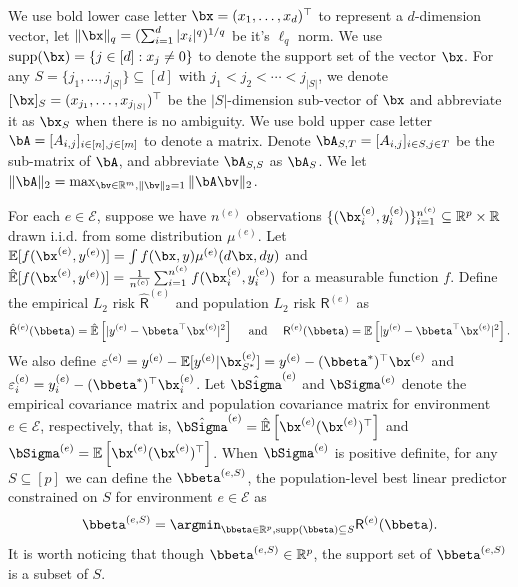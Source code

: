 \documentclass[10pt]{article}
\numberwithin{equation}{section}
\newcommand*{\supp}{\mathrm{supp}}
\begin{document}
{We use bold lower case letter $\bx = (x_1,\ldots, x_d)^\top$ to represent a $d$-dimension vector, let $\|\bx\|_q = (\sum_{i=1}^d |x_i|^q)^{1/q}$ be it's $\ell_q$ norm. We use $\supp(\bx) = \{j\in [d]: x_j \neq 0\}$ to denote the support set of the vector $\bx$. For any $S=\{j_1,\ldots, j_{|S|}\} \subseteq[d]$ with $j_1<j_2<\cdots<j_{|S|}$, we denote $[\bx]_{S} = (x_{j_1},\ldots, x_{j_{|S|}})^\top$ be the $|S|$-dimension sub-vector of $\bx$ and abbreviate it as $\bx_S$ when there is no ambiguity. We use bold upper case letter $\bA = [A_{i,j}]_{i\in [n], j\in [m]}$ to denote a matrix. Denote $\bA_{S,T} = [A_{i,j}]_{i\in S, j\in T}$ be the sub-matrix of $\bA$, and abbreviate $\bA_{S,S}$ as $\bA_S$. We let $\|\bA\|_2 = \max_{\bv\in \mathbb{R}^m, \|\bv\|_2=1} \|\bA \bv\|_2$.

For each $e\in \mathcal{E}$, suppose we have $n^{(e)}$ observations $\{(\bx_i^{(e)}, y_i^{(e)})\}_{i=1}^{n^{(e)}} \subseteq \mathbb{R}^p \times \mathbb{R}$ drawn i.i.d. from some distribution $\mu^{(e)}$. Let $\mathbb{E}[f(\bx^{(e)}, y^{(e)})] = \int f(\bx, y) \mu^{(e)}(d\bx, dy)$ and $\hat{\mathbb{E}}[f(\bx^{(e)},y^{(e)})] = \frac{1}{n^{(e)}} \sum_{i=1}^{n^{(e)}} f(\bx^{(e)}_i, y^{(e)}_i)$ for a measurable function $f$. Define the empirical $L_2$ risk $\hat{\mathsf{R}}^{(e)}$ and population $L_2$ risk $\mathsf{R}^{(e)}$  as
\begin{align}
\label{eq:def-l2-risk}
    \hat{\mathsf{R}}^{(e)}(\bbeta) = \hat{\mathbb{E}}\left[|y^{(e)} - \bbeta^\top \bx^{(e)}|^2\right] ~~~~ \text{and} ~~~~ \mathsf{R}^{(e)}(\bbeta) = \mathbb{E} \left[|y^{(e)} - \bbeta^\top \bx^{(e)}|^2\right].
\end{align} 
We also define $\varepsilon^{(e)} = y^{(e)} - \mathbb{E}[y^{(e)}|\bx_{S^*}^{(e)}] = y^{(e)} - (\bbeta^*)^\top \bx^{(e)}$ and $\varepsilon^{(e)}_i = y^{(e)}_i - (\bbeta^*)^\top \bx^{(e)}_i$. Let $\hat{\bSigma}^{(e)}$ and $\bSigma^{(e)}$ denote the empirical covariance matrix and population covariance matrix for environment $e\in \mathcal{E}$, respectively, that is, $\hat{\bSigma}^{(e)} = \hat{\mathbb{E}} \left[\bx^{(e)} (\bx^{(e)})^\top \right]$ and $\bSigma^{(e)} = \mathbb{E} \left[\bx^{(e)} (\bx^{(e)})^\top\right]$. When $\bSigma^{(e)}$ is positive definite, for any $S\subseteq [p]$ we can define the $\bbeta^{(e,S)}$, the population-level best linear predictor constrained on $S$ for environment $e\in \mathcal{E}$ as
\begin{align}
\label{eq:local-minimizer}
    \bbeta^{(e,S)} = \argmin_{\bbeta \in \mathbb{R}^p, \supp(\bbeta) \subseteq S} \mathsf{R}^{(e)}(\bbeta).
\end{align} It is worth noticing that though $\bbeta^{(e,S)} \in \mathbb{R}^p$, the support set of $\bbeta^{(e,S)}$ is a subset of $S$.

}
\end{document}
